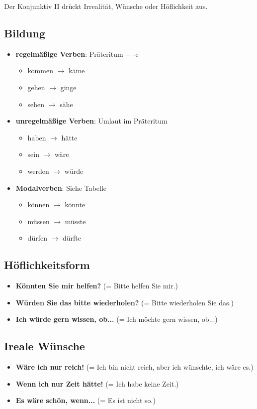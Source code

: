 Der Konjunktiv II drückt Irrealität, Wünsche oder Höflichkeit aus.

\subsection{Bildung}
\begin{itemize}
    \item \textbf{regelmäßige Verben}: Präteritum + -e
        \begin{itemize}
            \item kommen $\rightarrow$ käme
            \item gehen $\rightarrow$ ginge
            \item sehen $\rightarrow$ sähe
        \end{itemize}
    \item \textbf{unregelmäßige Verben}: Umlaut im Präteritum
        \begin{itemize}
            \item haben $\rightarrow$ hätte
            \item sein $\rightarrow$ wäre
            \item werden $\rightarrow$ würde
        \end{itemize}
    \item \textbf{Modalverben}: Siehe Tabelle
        \begin{itemize}
            \item können $\rightarrow$ könnte
            \item müssen $\rightarrow$ müsste
            \item dürfen $\rightarrow$ dürfte
        \end{itemize}
\end{itemize}

\subsection{Höflichkeitsform}
\begin{itemize}
    \item \textbf{Könnten Sie mir helfen?} (= Bitte helfen Sie mir.)
    \item \textbf{Würden Sie das bitte wiederholen?} (= Bitte wiederholen Sie das.)
    \item \textbf{Ich würde gern wissen, ob...} (= Ich möchte gern wissen, ob...)
\end{itemize}

\subsection{Ireale Wünsche}
\begin{itemize}
    \item \textbf{Wäre ich nur reich!} (= Ich bin nicht reich, aber ich wünschte, ich wäre es.)
    \item \textbf{Wenn ich nur Zeit hätte!} (= Ich habe keine Zeit.)
    \item \textbf{Es wäre schön, wenn...} (= Es ist nicht so.)
\end{itemize}

